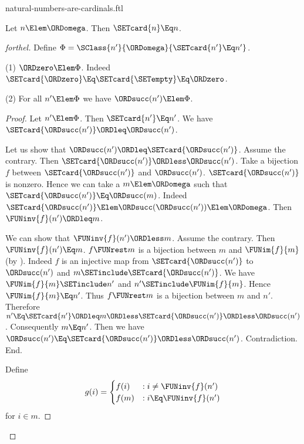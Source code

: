 \documentclass{stex}
\begin{document}
\begin{smodule}{natural-numbers-are-cardinals.ftl}

\begin{theorem}[forthel,id=SET_THEORY_07_2948332552978432]
  Let $n \Elem \ORDomega$.
  Then $\SETcard{n} \Eq n$.
\end{theorem}
\begin{proof}[forthel]
  Define $\Phi = \SClass{n'}{\ORDomega}{\SETcard{n'} \Eq n'}$.

  (1) $\ORDzero \Elem \Phi$.
  Indeed $\SETcard{\ORDzero} \Eq \SETcard{\SETempty} \Eq \ORDzero$.

  (2) For all $n' \Elem \Phi$ we have $\ORDsucc(n') \Elem \Phi$.
  \begin{proof}
    Let $n' \Elem \Phi$.
    Then $\SETcard{n'} \Eq n'$.
    We have $\SETcard{\ORDsucc(n')} \ORDleq \ORDsucc(n')$.

    Let us show that $\ORDsucc(n') \ORDleq \SETcard{\ORDsucc(n')}$.
      Assume the contrary.
      Then $\SETcard{\ORDsucc(n')} \ORDless \ORDsucc(n')$.
      Take a bijection $f$ between $\SETcard{\ORDsucc(n')}$ and $\ORDsucc(n')$.
      $\SETcard{\ORDsucc(n')}$ is nonzero.
      Hence we can take a $m \Elem \ORDomega$ such that $\SETcard{\ORDsucc(n')} \Eq \ORDsucc(m)$.
      Indeed $\SETcard{\ORDsucc(n')} \Elem \ORDsucc(\ORDsucc(n')) \Elem \ORDomega$.
      Then $\FUNinv{f}(n') \ORDleq m$.

      We can show that $\FUNinv{f}(n') \ORDless m$.
        Assume the contrary.
        Then $\FUNinv{f}(n') \Eq m$.
        $f \FUNrest m$ is a bijection between $m$ and $\FUNim{f}{m}$ (by ).
        Indeed $f$ is an injective map from $\SETcard{\ORDsucc(n')}$ to $\ORDsucc(n')$ and
        $m \SETinclude \SETcard{\ORDsucc(n')}$.
        We have $\FUNim{f}{m} \SETinclude n'$ and $n' \SETinclude \FUNim{f}{m}$.
        Hence $\FUNim{f}{m} \Eq n'$.
        Thus $f \FUNrest m$ is a bijection between $m$ and $n'$.
        Therefore $n'
          \Eq \SETcard{n'}
          \ORDleq m
          \ORDless \SETcard{\ORDsucc(n')}
          \ORDless \ORDsucc(n')$.
        Consequently $m \Eq n'$.
        Then we have $\ORDsucc(n') \Eq \SETcard{\ORDsucc(n')} \ORDless \ORDsucc(n')$.
        Contradiction.
      End.

      Define \[ g(i) =
        \begin{cases}
          f(i)  & : i \neq \FUNinv{f}(n')
          \\
          f(m)  & : i \Eq \FUNinv{f}(n')
        \end{cases} \]
      for $i \in m$.


\end{proof}
\end{proof}
\end{smodule}
\end{document}
